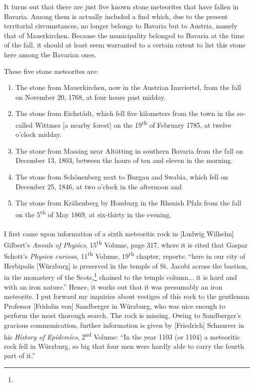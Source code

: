 \documentclass[a4paper, 12pt, oneside]{article}
\begin{document}
It turns out that there are just five known stone meteorites that have fallen in Bavaria. Among them is actually included a find which, due to the present territorial circumstances, no longer belongs to Bavaria but to Austria, namely that of Mauerkirchen. Because the municipality belonged to Bavaria at the time of the fall, it should at least seem warranted to a certain extent to list this stone here among the Bavarian ones.

These five stone meteorites are:
\begin{enumerate}
    \item The stone from Mauerkirchen, now in the Austrian Innviertel, from the fall on November 20, 1768, at four hours past midday.
    \item The stone from Eichstädt, which fell five kilometers from the town in the so-called Wittmes [a nearby forest] on the 19\textsuperscript{th} of February 1785, at twelve o'clock midday.
    \item The stone from Massing near Altötting in southern Bavaria from the fall on December 13, 1803, between the hours of ten and eleven in the morning.
    \item The stone from Schönenberg next to Burgau and Swabia, which fell on December 25, 1846, at two o'clock in the afternoon and
    \item The stone from Krähenberg by Homburg in the Rhenish Pfalz from the fall on the 5\textsuperscript{th} of May 1869, at six-thirty in the evening.
\end{enumerate}
\paragraph*{}
I first came upon information of a sixth meteoritic rock in [Ludwig Wilhelm] Gilbert's \emph{Annals of Physics}, 15\textsuperscript{th} Volume, page 317, where it is cited that Gaspar Schott's \emph{Physica curiosa}, 11\textsuperscript{th} Volume, 19\textsuperscript{th} chapter, reports: ``here in our city of Herbipolis [Würzburg] is preserved in the temple of St. Jacobi across the bastion, in the monastery of the Scots,\footnote{} chained to the temple column... it is hard and with an iron nature.'' Hence, it works out that it was presumably an iron meteorite. I put forward my inquiries about vestiges of this rock to the gentleman Professor [Fridolin von] Sandberger in Würzburg, who was nice enough to perform the most thorough search. The rock is missing. Owing to Sandberger's gracious communication, further information is given by [Friedrich] Schnurrer in his \emph{History of Epidemics}, 2\textsuperscript{nd} Volume: ``In the year 1103 (or 1104) a meteoritic rock fell in Würzburg, so big that four men were hardly able to carry the fourth part of it.''
\clearpage
\end{document}
